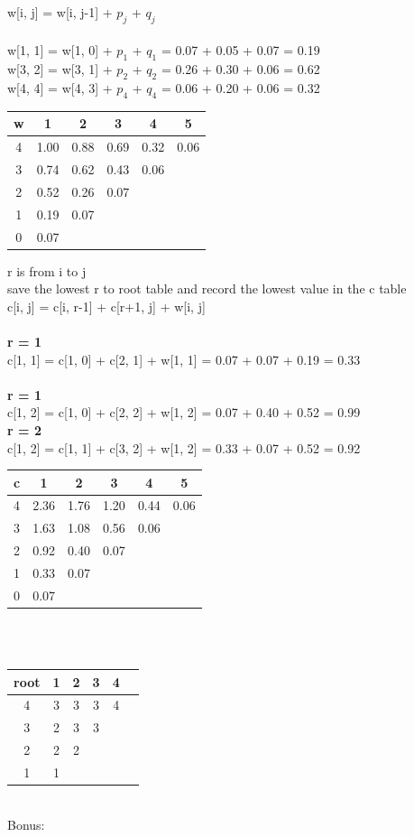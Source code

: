 \documentclass{article}
\begin{document}
w[i, j] = w[i, j-1] + $p_{j}$ + $q_{j}$\\
\\
w[1, 1] = w[1, 0] + $p_{1}$ + $q_{1}$ = 0.07 + 0.05 + 0.07 = 0.19 \\
w[3, 2] = w[3, 1] + $p_{2}$ + $q_{2}$ = 0.26 + 0.30 + 0.06 = 0.62 \\
w[4, 4] = w[4, 3] + $p_{4}$ + $q_{4}$ = 0.06 + 0.20 + 0.06 = 0.32 \\

\begin{tabular}{ c | c | c | c | c | c}         
w & 1 & 2 & 3 & 4 & 5 \\ 
\hline 4 & 1.00 & 0.88 & 0.69 & 0.32 & 0.06 \\  
\hline 3 & 0.74 & 0.62 & 0.43 & 0.06 \\
\hline 2 & 0.52 & 0.26 & 0.07 \\
\hline 1 & 0.19 & 0.07 \\   
\hline 0 & 0.07        
\end{tabular}

r is from i to j \\
save the lowest r to root table and record the lowest value in the c table\\
c[i, j] = c[i, r-1] + c[r+1, j] + w[i, j]\\
\\
\textbf{r = 1} \\
c[1, 1] = c[1, 0] + c[2, 1] + w[1, 1] = 0.07 + 0.07 + 0.19 = 0.33\\
\\
\textbf{r = 1} \\
c[1, 2] = c[1, 0] + c[2, 2] + w[1, 2] = 0.07 + 0.40 + 0.52 = 0.99\\
\textbf{r = 2} \\
c[1, 2] = c[1, 1] + c[3, 2] + w[1, 2] = 0.33 + 0.07 + 0.52 = 0.92\\

\begin{tabular}{ c | c | c | c | c | c}         
c & 1 & 2 & 3 & 4 & 5 \\ 
\hline 4 & 2.36 & 1.76 & 1.20 & 0.44 & 0.06 \\  
\hline 3 & 1.63 & 1.08 & 0.56 & 0.06 \\
\hline 2 & 0.92 & 0.40 & 0.07 \\
\hline 1 & 0.33 & 0.07 \\   
\hline 0 & 0.07     
\end{tabular}
\\ \\
\begin{tabular}{ c | c | c | c | c | c}         
root & 1 & 2 & 3 & 4  \\ 
\hline 4    & 3 & 3 & 3 & 4 \\  
\hline 3    & 2 & 3 & 3 \\
\hline 2    & 2 & 2 \\
\hline 1    & 1 \\   
\end{tabular}
\\
Bonus:\\
\end{document}
